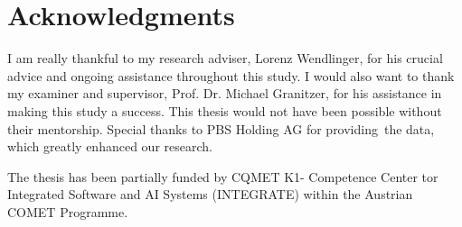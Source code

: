 \chapter*{Acknowledgments}

I am really thankful to my research adviser, Lorenz Wendlinger, for his crucial advice and ongoing assistance throughout this study. I would also want to thank my examiner and supervisor, Prof. Dr. Michael Granitzer, for his assistance in making this study a success. This thesis would not have been possible without their mentorship. Special thanks to PBS Holding AG for providing the data, which greatly enhanced our research. 

The thesis has been partially funded by CQMET K1- Competence Center tor Integrated
Software and AI Systems (INTEGRATE) within the Austrian COMET Programme.
